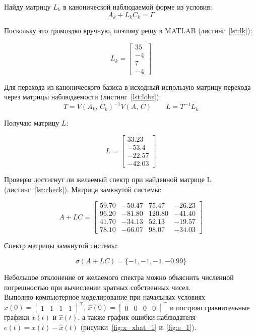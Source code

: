 \documentclass[a4paper,12pt]{article}
\begin{document}
Найду матрицу $L_k$ в канонической наблюдаемой форме из условия:
\[
A_k + L_k C_k = \Gamma
\]

Поскольку это громоздко вручную, поэтому решу в MATLAB (листинг~\ref{lst:lk}):

\[L_k =   \begin{bmatrix}
	35 \\ -4 \\ 7 \\ -4 
\end{bmatrix}\]

Для перехода из канонического базиса в исходный использую матрицу перехода
через матрицы наблюдаемости (листинг~\ref{lst:lobs}):
\[
T = V(A_k,\, C_k)^{-1} V(A,\, C) \qquad L = T^{-1} L_k
\]

Получаю матрицу \(L\):

\[L =   \begin{bmatrix}
	33.23 \\ -53.4 \\ -22.57 \\ -42.03
\end{bmatrix}\]

Проверю достигнут ли желаемый спектр при найденной матрице L (листинг~\ref{lst:check}). Матрица замкнутой системы:

\[
A + L C = \begin{bmatrix}
	59.70 & -50.47 & 75.47 & -26.23 \\
	96.20 & -81.80 & 120.80 & -41.40 \\
	41.70 & -34.13 & 52.13 & -19.57 \\
	78.10 & -66.07 & 98.07 & -34.03
\end{bmatrix}
\]

Спектр матрицы замкнутой системы:

\[
\sigma(A + L C) = \{-1, -1, -1, -0.99\}
\]

Небольшое отклонение от желаемого спектра можно объяснить численной погрешностью при вычислении кратных собственных чисел. \\

Выполню компьютерное моделирование при начальных условиях
$x(0) = \begin{bmatrix} 1 & 1 & 1 & 1 \end{bmatrix}^\top$,
$\hat{x}(0) = \begin{bmatrix} 0 & 0 & 0 & 0 \end{bmatrix}^\top$
и построю сравнительные графики $x(t)$ и $\hat{x}(t)$,
а также график ошибки наблюдателя $e(t) = x(t) - \hat{x}(t)$
(рисунки~\ref{fig:x_xhat_1} и~\ref{fig:e_1}).
\end{document}
